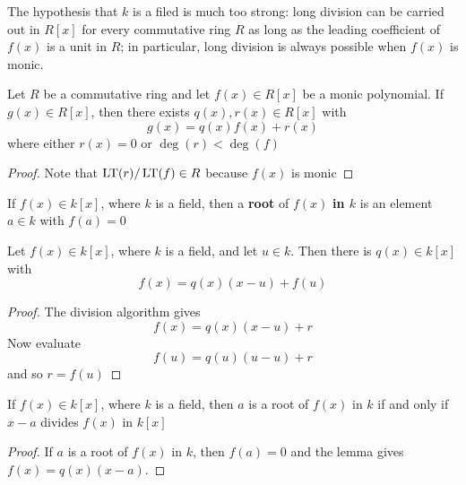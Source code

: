 \documentclass[11pt]{article}
\begin{document}
The hypothesis that \(k\) is a filed is much too strong: long division can be
carried out in \(R[x]\) for every commutative ring \(R\) as long as the leading
coefficient of \(f(x)\) is a unit in \(R\); in particular, long division is
always possible when \(f(x)\) is monic.

\begin{corollary}[]
Let \(R\) be a commutative ring and let \(f(x)\in R[x]\) be a monic polynomial.
If \(g(x)\in R[x]\), then there exists \(q(x),r(x)\in R[x]\) with
\begin{equation*}
g(x)=q(x)f(x)+r(x)
\end{equation*}
where either \(r(x)=0\) or \(\deg(r)<\deg(f)\)
\end{corollary}

\begin{proof}
Note that \(\operatorname{LT}(r)/\operatorname{LT}(f)\in R\) because \(f(x)\) is monic
\end{proof}

\begin{definition}[]
If \(f(x)\in k[x]\), where \(k\) is a field, then a \textbf{root} of \(f(x)\) \textbf{in \(k\)} is an
element \(a\in k\) with \(f(a)=0\)
\end{definition}

\begin{lemma}[]
Let \(f(x)\in k[x]\), where \(k\) is a field, and let \(u\in k\). Then there is
\(q(x)\in k[x]\) with
\begin{equation*}
f(x)=q(x)(x-u)+f(u)
\end{equation*}
\end{lemma}
\begin{proof}
The division algorithm gives
\begin{equation*}
f(x)=q(x)(x-u)+r
\end{equation*}
Now evaluate
\begin{equation*}
f(u)=q(u)(u-u)+r
\end{equation*}
and so \(r=f(u)\)
\end{proof}

\begin{proposition}[]
\label{prop3.24}
If \(f(x)\in k[x]\), where \(k\) is a field, then \(a\) is a root of \(f(x)\) in \(k\)
if and only if \(x-a\) divides \(f(x)\) in \(k[x]\)
\end{proposition}

\begin{proof}
If \(a\) is a root of \(f(x)\) in \(k\), then \(f(a)=0\) and the lemma gives
\(f(x)=q(x)(x-a)\). 
\end{proof}
\end{document}
